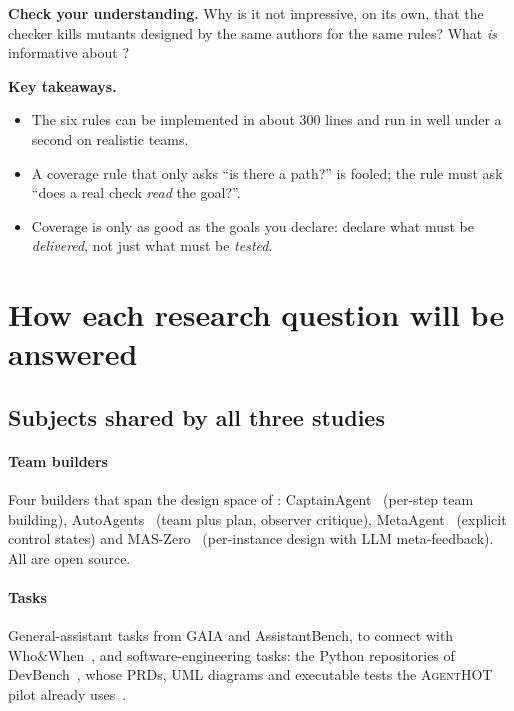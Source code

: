 \documentclass[10pt,a4paper]{article}
\newcommand{\tool}{\textsc{AgentHOT}}
\newenvironment{think}[1][Check your understanding]{%
  \begin{tcolorbox}[enhanced, colback=thinkbg, colframe=thinkbg, arc=0pt, boxrule=0pt,
     borderline west={2.2pt}{0pt}{thinkbar}, left=8pt, right=8pt, top=5pt, bottom=5pt,
     before skip=8pt, after skip=8pt]
  \textsf{\bfseries\color{thinkbar}#1.}\enspace}{\end{tcolorbox}}
\newenvironment{takeaway}{%
  \begin{tcolorbox}[enhanced, colback=keybg, colframe=keybg, arc=0pt, boxrule=0pt,
     borderline west={2.2pt}{0pt}{keybar}, left=8pt, right=8pt, top=5pt, bottom=5pt,
     before skip=8pt, after skip=8pt]
  \textsf{\bfseries\color{keybar}Key takeaways.}\par\smallskip}{\end{tcolorbox}}
\begin{document}
\begin{think}
Why is it not impressive, on its own, that the checker kills mutants
designed by the same authors for the same rules? What \emph{is} informative
about ?
\end{think}

\begin{takeaway}
\begin{itemize}
\item The six rules can be implemented in about 300 lines and run in well
under a second on realistic teams.
\item A coverage rule that only asks ``is there a path?'' is fooled; the rule
must ask ``does a real check \emph{read} the goal?''.
\item Coverage is only as good as the goals you declare: declare what must be
\emph{delivered}, not just what must be \emph{tested}.
\end{itemize}
\end{takeaway}
\section{How each research question will be answered}\label{sec:plan}

\subsection{Subjects shared by all three studies}

\paragraph{Team builders} Four builders that span the design space of
: CaptainAgent~\cite{song2024captain} (per-step team
building), AutoAgents~\cite{chen2024autoagents} (team plus plan, observer
critique), MetaAgent~\cite{zhang2025metaagent} (explicit control states)
and MAS-Zero~\cite{ke2025maszero} (per-instance design with LLM
meta-feedback). All are open source.

\paragraph{Tasks} General-assistant tasks from GAIA and AssistantBench, to
connect with Who\&When~\cite{zhang2025whowhen}, and software-engineering
tasks: the Python repositories of DevBench~\cite{li2024devbench}, whose
PRDs, UML diagrams and executable tests the \tool{} pilot already
uses~\cite{agenthot2026}.
\end{document}
